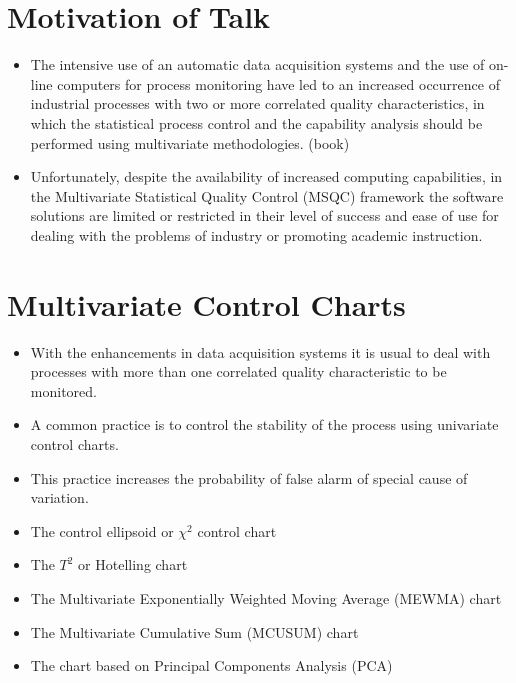 \documentclass[11pt]{article} %
\begin{document}
\tableofcontents
\newpage

\section{Motivation of Talk}


\begin{itemize}
\item The intensive use of an automatic data acquisition systems and the use of
on-line computers for process monitoring have led to an increased occurrence of
industrial processes with two or more correlated quality characteristics, in which
the statistical process control and the capability analysis should be performed using
multivariate methodologies. (book)
\item Unfortunately, despite the availability of increased computing capabilities, in
the Multivariate Statistical Quality Control (MSQC) framework the software
solutions are limited or restricted in their level of success and ease of use for
dealing with the problems of industry or promoting academic instruction.
\end{itemize}

\newpage
\section{Multivariate Control Charts}

\begin{itemize}
\item With the enhancements in data acquisition systems it is usual to deal with processes
with more than one correlated quality characteristic to be monitored. 
\item A common
practice is to control the stability of the process using univariate control charts.
\item This
practice increases the probability of false alarm of special cause of variation.
\end{itemize}
\newpage

\begin{itemize}
\item The control ellipsoid or $\chi^2$ control chart
\item The $T^2$ or Hotelling chart
\item The Multivariate Exponentially Weighted Moving Average (MEWMA) chart
\item The Multivariate Cumulative Sum (MCUSUM) chart
\item The chart based on Principal Components Analysis (PCA)
\end{itemize}
\end{document}
